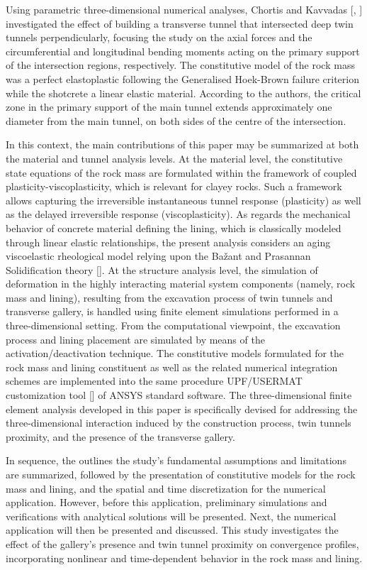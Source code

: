 \documentclass[a4paper,fleqn]{cas-sc}
\begin{document}
Using parametric three-dimensional numerical analyses, Chortis and Kavvadas [, ] investigated the effect of building a transverse tunnel that intersected deep twin tunnels perpendicularly, focusing the study on the axial forces and the circumferential and longitudinal bending moments acting on the primary support of the intersection regions, respectively. The constitutive model of the rock mass was a perfect elastoplastic following the Generalised Hoek-Brown failure criterion while the shotcrete a linear elastic material. According to the authors, the critical zone in the primary support of the main tunnel extends approximately one diameter from the main tunnel, on both sides of the centre of the intersection.

In this context, the main contributions of this paper may be summarized at both the material and tunnel analysis levels. At the material level, the constitutive state equations of the rock mass are formulated within the framework of coupled plasticity-viscoplasticity, which is relevant for clayey rocks. Such a framework allows capturing the irreversible instantaneous tunnel response (plasticity) as well as the delayed irreversible response (viscoplasticity).  As regards the mechanical behavior of concrete material defining the lining, which is classically modeled through linear elastic relationships, the present analysis considers an aging viscoelastic rheological model relying upon the Bažant and Prasannan Solidification theory []. At the structure analysis level, the simulation of deformation in the highly interacting material system components (namely, rock mass and lining), resulting from the excavation process of twin tunnels and transverse gallery, is handled using finite element simulations performed in a three-dimensional setting. From the computational viewpoint, the excavation process and lining placement are simulated by means of the activation/deactivation technique. The constitutive models formulated for the rock mass and lining constituent as well as the related numerical integration schemes are implemented into the same procedure UPF/USERMAT customization tool [] of ANSYS standard software. The three-dimensional finite element analysis developed in this paper is specifically devised for addressing the three-dimensional interaction induced by the construction process, twin tunnels proximity, and the presence of the transverse gallery.

In sequence, the outlines the study's fundamental assumptions and limitations are summarized, followed by the presentation of constitutive models for the rock mass and lining, and the spatial and time discretization for the numerical application. However, before this application, preliminary simulations and verifications with analytical solutions will be presented. Next, the numerical application will then be presented and discussed. This study investigates the effect of the gallery's presence and twin tunnel proximity on convergence profiles, incorporating nonlinear and time-dependent behavior in the rock mass and lining.
\end{document}
